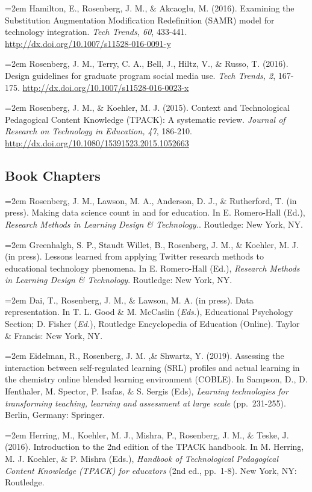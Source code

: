 \documentclass[
  14,
]{article}
\begin{document}
\hangindent=2em Hamilton, E., Rosenberg, J. M., \& Akcaoglu, M. (2016).
Examining the Substitution Augmentation Modification Redefinition (SAMR)
model for technology integration. \emph{Tech Trends, 60}, 433-441.
\url{http://dx.doi.org/10.1007/s11528-016-0091-y}

\hangindent=2em Rosenberg, J. M., Terry, C. A., Bell, J., Hiltz, V., \&
Russo, T. (2016). Design guidelines for graduate program social media
use. \emph{Tech Trends, 2}, 167-175.
\url{http://dx.doi.org/10.1007/s11528-016-0023-x}

\hangindent=2em Rosenberg, J. M., \& Koehler, M. J. (2015). Context and
Technological Pedagogical Content Knowledge (TPACK): A systematic
review. \emph{Journal of Research on Technology in Education, 47},
186-210. \url{http://dx.doi.org/10.1080/15391523.2015.1052663}

\hypertarget{book-chapters}{%
\subsection{Book Chapters}\label{book-chapters}}

\hangindent=2em Rosenberg, J. M., Lawson, M. A., Anderson, D. J., \&
Rutherford, T. (in press). Making data science count in and for
education. In E. Romero-Hall (Ed.), \emph{Research Methods in Learning
Design \& Technology.}. Routledge: New York, NY.

\hangindent=2em Greenhalgh, S. P., Staudt Willet, B., Rosenberg, J. M.,
\& Koehler, M. J. (in press). Lessons learned from applying Twitter
research methods to educational technology phenomena. In E. Romero-Hall
(Ed.), \emph{Research Methods in Learning Design \& Technology}.
Routledge: New York, NY.

\hangindent=2em Dai, T., Rosenberg, J. M., \& Lawson, M. A. (in press).
Data representation. In T. L. Good \& M. McCaslin (\emph{Eds.}),
Educational Psychology Section; D. Fisher (\emph{Ed.}), Routledge
Encyclopedia of Education (Online). Taylor \& Francis: New York, NY.

\hangindent=2em Eidelman, R., Rosenberg, J. M. ,\& Shwartz, Y. (2019).
Assessing the interaction between self-regulated learning (SRL) profiles
and actual learning in the chemistry online blended learning environment
(COBLE). In Sampson, D., D. Ifenthaler, M. Spector, P. Isafas, \& S.
Sergis (Eds), \emph{Learning technologies for transforming teaching,
learning and assessment at large scale} (pp.~231-255). Berlin, Germany:
Springer.

\hangindent=2em Herring, M., Koehler, M. J., Mishra, P., Rosenberg, J.
M., \& Teske, J. (2016). Introduction to the 2nd edition of the TPACK
handbook. In M. Herring, M. J. Koehler, \& P. Mishra (Eds.),
\emph{Handbook of Technological Pedagogical Content Knowledge (TPACK)
for educators} (2nd ed., pp.~1-8). New York, NY: Routledge.
\end{document}
